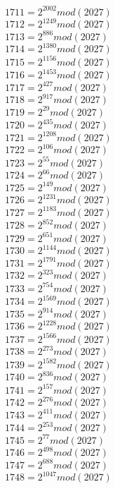 \documentclass[12pt, letterpaper]{article}
\begin{document}
\begin{itemize}
\begin{multicols}{3}
$1711= 2^{2002} mod (2027)$\\
$1712= 2^{1249} mod (2027)$\\
$1713= 2^{886} mod (2027)$\\
$1714= 2^{1380} mod (2027)$\\
$1715= 2^{1156} mod (2027)$\\
$1716= 2^{1453} mod (2027)$\\
$1717= 2^{427} mod (2027)$\\
$1718= 2^{917} mod (2027)$\\
$1719= 2^{29} mod (2027)$\\
$1720= 2^{435} mod (2027)$\\
$1721= 2^{1208} mod (2027)$\\
$1722= 2^{106} mod (2027)$\\
$1723= 2^{55} mod (2027)$\\
$1724= 2^{66} mod (2027)$\\
$1725= 2^{149} mod (2027)$\\
$1726= 2^{1231} mod (2027)$\\
$1727= 2^{1183} mod (2027)$\\
$1728= 2^{852} mod (2027)$\\
$1729= 2^{651} mod (2027)$\\
$1730= 2^{1144} mod (2027)$\\
$1731= 2^{1791} mod (2027)$\\
$1732= 2^{323} mod (2027)$\\
$1733= 2^{754} mod (2027)$\\
$1734= 2^{1569} mod (2027)$\\
$1735= 2^{914} mod (2027)$\\
$1736= 2^{1228} mod (2027)$\\
$1737= 2^{1566} mod (2027)$\\
$1738= 2^{273} mod (2027)$\\
$1739= 2^{1582} mod (2027)$\\
$1740= 2^{836} mod (2027)$\\
$1741= 2^{157} mod (2027)$\\
$1742= 2^{276} mod (2027)$\\
$1743= 2^{411} mod (2027)$\\
$1744= 2^{253} mod (2027)$\\
$1745= 2^{77} mod (2027)$\\
$1746= 2^{498} mod (2027)$\\
$1747= 2^{688} mod (2027)$\\
$1748= 2^{1047} mod (2027)$\\

\end{multicols}
\end{itemize}
\end{document}
